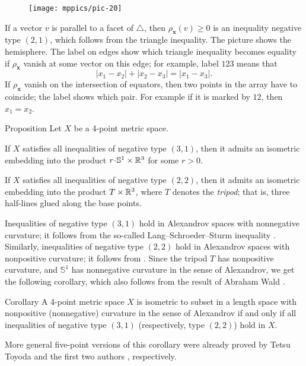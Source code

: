 \documentclass[a4paper,10pt]{article}
\begin{document}
\begin{wrapfigure}{o}{36mm}
\centering
\vskip-4mm
\texttt{[image: mppics/pic-20]}
\vskip-0mm
\end{wrapfigure}

If a vector $v$ is parallel to a facet of $\triangle$, then $\rho_{\bm{x}}(v)\ge 0$ is an inequality negative type $(2,1)$, which follows from the triangle inequality.
The picture shows the hemisphere.
The label on edges show which triangle inequality becomes equality if $\rho_{\bm{x}}$ vanish at some vector on this edge;
for example, label $123$ means that
\[|x_1-x_2|+|x_2-x_3|=|x_1-x_3|.\]
If $\rho_{\bm{x}}$ vanish on the intersection of equators, then two points in the array have to coincide;
the label shows which pair.
For example if it is marked by $12$, then $x_1=x_2$.

\begin{thm}{Proposition}\label{prop:Four-point arrays}
Let $X$ be a 4-point metric space.

If $X$ satisfies all inequalities of negative type $(3, 1)$, then it admits an isometric embedding into the product $r\cdot \mathbb{S}^1\times\RR^3$ for some $r>0$.

If $X$ satisfies all inequalities of negative type $(2, 2)$, then it admits an isometric embedding into the product $T\times\mathbb{R}^3$, where $T$ denotes the \emph{tripod};
that is, three half-lines glued along the base points.
\end{thm}

Inequalities of negative type $(3, 1)$ hold in Alexandrov spaces with nonnegative curvature; it follows from the so-called Lang--Schroeder--Sturm inequality \cite{lang-schroeder, sturm}.
Similarly, inequalities of negative type $(2, 2)$ hold in Alexandrov spaces with nonpositive curvature; it follows from \cite[9.5]{AKP-2024}.
Since the tripod $T$ has nonpositive curvature, and $\mathbb{S}^1$ has nonnegative curvature in the sense of Alexandrov, we get the following corollary, which also follows from the result of Abraham Wald \cite[§ 7]{wald}.

\begin{thm}{Corollary}\label{cor:Four-point arrays}
A 4-point metric space $X$ is isometric to subset in a length space with nonpositive (nonnegative) curvature in the sense of Alexandrov if and only if all inequalities of negative type $(3, 1)$ (respectively, type $(2, 2)$) hold in $X$.
\end{thm}

More general five-point versions of this corollary were already proved by Tetsu Toyoda \cite{toyoda,lebedeva-petrunin2021} and the first two authors \cite{lebedeva-petrunin-2024}, respectively.
\end{document}
